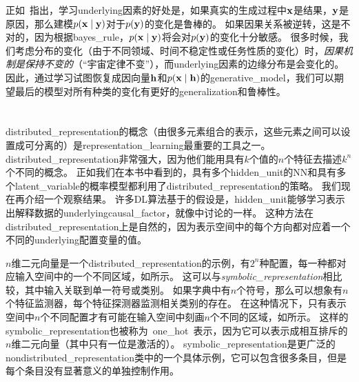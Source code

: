 
正如~\cite{Janzing-et-al-ICML2012}指出，学习\gls{underlying}因素的好处是，如果真实的生成过程中$\mathbf{x}$是结果，$\mathbf{y}$是原因，那么建模$p(\mathbf{x} \mid \mathbf{y})$对于$p(\mathbf{y})$的变化是鲁棒的。
如果因果关系被逆转，这是不对的，因为根据\gls{bayes_rule}，$p(\mathbf{x} \mid \mathbf{y})$将会对$p(\mathbf{y})$的变化十分敏感。
很多时候，我们考虑分布的变化（由于不同领域、时间不稳定性或任务性质的变化）时，\emph{因果机制是保持不变的}（``宇宙定律不变''），而\gls{underlying}因素的边缘分布是会变化的。
因此，通过学习试图恢复成因向量$\mathbf{h}$和$p(\mathbf{x} \mid \mathbf{h})$的\gls{generative_model}，我们可以期望最后的模型对所有种类的变化有更好的\gls{generalization}和鲁棒性。


\section{}
\label{sec:distributed_representation}

\gls{distributed_representation}的概念（由很多元素组合的表示，这些元素之间可以设置成可分离的）是\gls{representation_learning}最重要的工具之一。
\gls{distributed_representation}非常强大，因为他们能用具有$k$个值的$n$个特征去描述$k^n$个不同的概念。
正如我们在本书中看到的，具有多个\gls{hidden_unit}的\gls{NN}和具有多个\gls{latent_variable}的概率模型都利用了\gls{distributed_representation}的策略。
我们现在再介绍一个观察结果。
许多\gls{DL}算法基于的假设是，\gls{hidden_unit}能够学习表示出解释数据的\gls{underlying}\gls{causal_factor}，就像中讨论的一样。
这种方法在\gls{distributed_representation}上是自然的，因为表示空间中的每个方向都对应着一个不同的\gls{underlying}配置变量的值。


$n$维二元向量是一个\gls{distributed_representation}的示例，有$2^n$种配置，每一种都对应输入空间中的一个不同区域，如所示。
这可以与\emph{\gls{symbolic_representation}}相比较，其中输入关联到单一符号或类别。
如果字典中有$n$个符号，那么可以想象有$n$个特征监测器，每个特征探测器监测相关类别的存在。
在这种情况下，只有表示空间中$n$个不同配置才有可能在输入空间中刻画$n$个不同的区域，如所示。
这样的\gls{symbolic_representation}也被称为~\gls{one_hot}~表示，因为它可以表示成相互排斥的$n$维二元向量（其中只有一位是激活的）。
\gls{symbolic_representation}是更广泛的\gls{nondistributed_representation}类中的一个具体示例，它可以包含很多条目，但是每个条目没有显著意义的单独控制作用。

